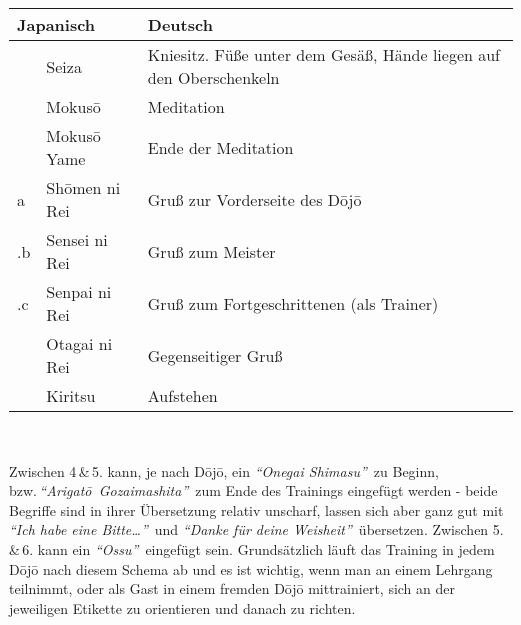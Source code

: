 	\setcounter{num}{0}\setcounter{numz}{0}
	\null\vfill\null	
	\begin{tabularx}{\textwidth}{llX}
		\multicolumn{2}{l}{\textbf{Japanisch}} 	& \textbf{Deutsch}\\
		\midrule
		\ctu		& Seiza 				& Kniesitz. Füße unter dem Gesäß, Hände liegen auf den Oberschenkeln\\
		\ctu		& Mokus\={o}			& Meditation\\
		\ctu		& Mokus\={o} Yame		& Ende der Meditation\\
		\ctu a		& Sh\={o}men ni Rei		& Gruß zur Vorderseite des D\={o}j\={o}\\
		\thenum .b	& Sensei ni Rei			& Gruß zum Meister\\
		\thenum .c	& Senpai ni Rei			& Gruß zum Fortgeschrittenen (als Trainer)\\
		\ctu		& Otagai ni Rei			& Gegenseitiger Gruß\\
		\ctu		& Kiritsu				& Aufstehen\\		
		\midrule
	\end{tabularx}\\\null\vfill\null
	\begin{center}
		\parbox{\textwidth-2\tabcolsep}{Zwischen 4\,\&\,5. kann, je nach D\={o}j\={o}, ein \textit{\textquotedblleft Onegai Shimasu\textquotedblright}~zu Beginn, bzw.\,\textit{\mbox{\textquotedblleft Arigat\={o} Gozaimashita\textquotedblright}}~zum Ende des Trainings eingefügt werden - beide Begriffe sind in ihrer Übersetzung relativ unscharf, lassen sich aber ganz gut mit \textit{\textquotedblleft Ich habe eine Bitte\dots\textquotedblright}~und \textit{\textquotedblleft Danke für deine Weisheit\textquotedblright}~übersetzen. Zwischen 5.\,\&\,6. kann ein \textit{\textquotedblleft Ossu\textquotedblright}~eingefügt sein. Grundsätzlich läuft das Training in jedem D\={o}j\={o} nach diesem Schema ab und es ist wichtig, wenn man an einem Lehrgang teilnimmt, oder als Gast in einem fremden D\={o}j\={o} mittrainiert, sich an der jeweiligen Etikette zu orientieren und danach zu richten.}
	\end{center}\null\vfill\null